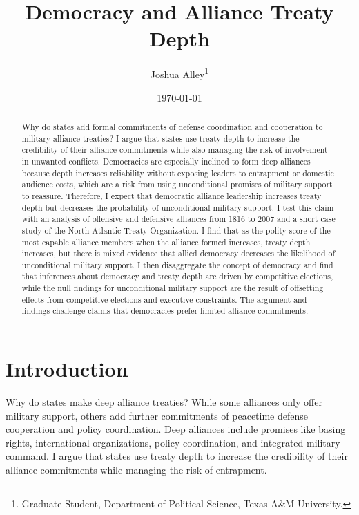 \documentclass[12pt]{article}
\title{\textbf{Democracy and Alliance Treaty Depth}}
\author{Joshua Alley\footnote{Graduate Student,
Department of Political Science, Texas A\&M University.}}
\date{\today}
\begin{document}
\maketitle 

\doublespace 

\begin{abstract}
Why do states add formal commitments of defense coordination and cooperation to military alliance treaties? 
I argue that states use treaty depth to increase the credibility of their alliance commitments while also managing the risk of involvement in unwanted conflicts. 
Democracies are especially inclined to form deep alliances because depth increases reliability without exposing leaders to entrapment or domestic audience costs, which are a risk from using unconditional promises of military support to reassure. 
Therefore, I expect that democratic alliance leadership increases treaty depth but decreases the probability of unconditional military support. 
I test this claim with an analysis of offensive and defensive alliances from 1816 to 2007 and a short case study of the North Atlantic Treaty Organization.
I find that as the polity score of the most capable alliance members when the alliance formed increases, treaty depth increases, but there is mixed evidence that allied democracy decreases the likelihood of unconditional military support. 
I then disaggregate the concept of democracy and find that inferences about democracy and treaty depth are driven by competitive elections, while the null findings for unconditional military support are the result of offsetting effects from competitive elections and executive constraints.  
The argument and findings challenge claims that democracies prefer limited alliance commitments. 
\end{abstract}


\newpage 


\section{Introduction}


Why do states make deep alliance treaties? 
While some alliances only offer military support, others add further commitments of peacetime defense cooperation and policy coordination. 
Deep alliances include promises like basing rights, international organizations, policy coordination, and integrated military command.
I argue that states use treaty depth to increase the credibility of their alliance commitments while managing the risk of entrapment. 
\end{document}

